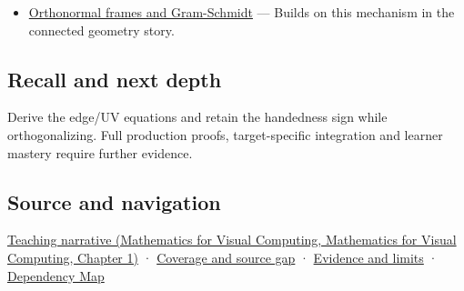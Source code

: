 \begin{itemize}
\tightlist
\item
  \hyperref[appendix-c39f1ed34271]{Orthonormal frames and Gram-Schmidt} --- Builds on this mechanism in the connected geometry story.
\end{itemize}

\subsection{Recall and next depth}\label{appendix-e31893dec985-recall-and-next-depth}

Derive the edge/UV equations and retain the handedness sign while orthogonalizing. Full production proofs, target-specific integration and learner mastery require further evidence.

\subsection{Source and navigation}\label{appendix-e31893dec985-source-and-navigation}

\href{../02-Mathematics-for-Visual-Computing/main.pdf\#nameddest=01-foundations-i-ch017-surface-movement-becomes-a-local-frame}{Teaching narrative (Mathematics for Visual Computing, Mathematics for Visual Computing, Chapter 1)} · \hyperref[appendix-fd090d982a15-phase-6---parts-501-600]{Coverage and source gap} · \hyperref[appendix-a103e7846d21-phase-6---source-analysis-and-verification]{Evidence and limits} · \hyperref[appendix-4ad47bdd269a]{Dependency Map}
